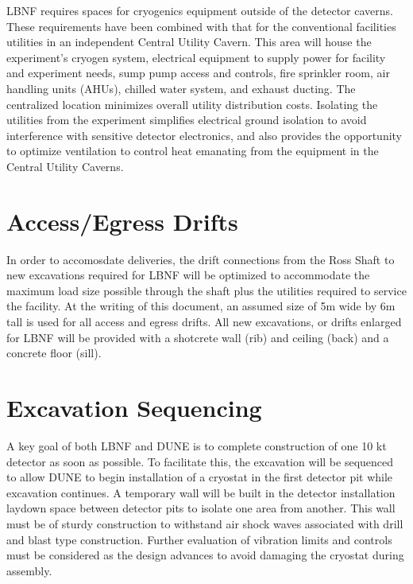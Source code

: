 LBNF requires spaces for cryogenics equipment outside of the detector caverns. These requirements have been combined with that for the conventional facilities utilities in an independent Central Utility Cavern. This area will house the experiment’s cryogen system, electrical equipment to supply power for facility and experiment needs, sump pump access and controls, fire sprinkler room, air handling units (AHUs), chilled water system, and exhaust ducting. The centralized location minimizes overall utility distribution costs.  Isolating the utilities from the experiment simplifies electrical ground isolation to avoid interference with sensitive detector electronics, and also provides the opportunity to optimize ventilation to control heat emanating from the equipment in the Central Utility Caverns.

\section{Access/Egress Drifts}
\label{sec:fscf-excav-access-drifts}

In order to accomosdate deliveries, the drift connections from the Ross Shaft to new excavations required for LBNF will be optimized to accommodate the maximum load size possible through the shaft plus the utilities required to service the facility.  At the writing of this document, an assumed size of 5m wide by 6m tall is used for all access and egress drifts.  All new excavations, or drifts enlarged for LBNF will be provided with a shotcrete wall (rib) and ceiling (back) and a concrete floor (sill).

\section{Excavation Sequencing}
\label{sec:fscf-excav-exc-seq}

A key goal of both LBNF and DUNE is to complete construction of one 10 kt detector as soon as possible.  To facilitate this, the excavation will be sequenced to allow DUNE to begin installation of a cryostat in the first detector pit while excavation continues.  A temporary wall will be built in the detector installation laydown space between detector pits to isolate one area from another.  This wall must be of sturdy construction to withstand air shock waves associated with drill and blast type construction.  Further evaluation of vibration limits and controls must be considered as the design advances to avoid damaging the cryostat during assembly.

